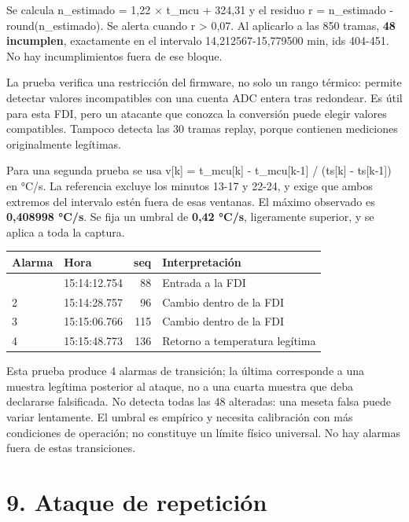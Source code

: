 \documentclass[
  11pt,
]{article}
\begin{document}
Se calcula n\_estimado = 1,22 × t\_mcu + 324,31 y el residuo r =
\textbar n\_estimado - round(n\_estimado)\textbar. Se alerta cuando r
\textgreater{} 0,07. Al aplicarlo a las 850 tramas, \textbf{48
incumplen}, exactamente en el intervalo 14,212567-15,779500 min, ids
404-451. No hay incumplimientos fuera de ese bloque.

La prueba verifica una restricción del firmware, no solo un rango
térmico: permite detectar valores incompatibles con una cuenta ADC
entera tras redondear. Es útil para esta FDI, pero un atacante que
conozca la conversión puede elegir valores compatibles. Tampoco detecta
las 30 tramas replay, porque contienen mediciones originalmente
legítimas.

Para una segunda prueba se usa v{[}k{]} = \textbar t\_mcu{[}k{]} -
t\_mcu{[}k-1{]}\textbar{} / (ts{[}k{]} - ts{[}k-1{]}) en °C/s. La
referencia excluye los minutos 13-17 y 22-24, y exige que ambos extremos
del intervalo estén fuera de esas ventanas. El máximo observado es
\textbf{0,408998 °C/s}. Se fija un umbral de \textbf{0,42 °C/s},
ligeramente superior, y se aplica a toda la captura.

\Needspace{4.5cm}
\begin{longtable}[]{@{}llrl@{}}
\toprule\noalign{}
Alarma & Hora & seq & Interpretación \\
\midrule\noalign{}
\endhead
\bottomrule\noalign{}
\endlastfoot
1 & 15:14:12.754 & 88 & Entrada a la FDI \\
2 & 15:14:28.757 & 96 & Cambio dentro de la FDI \\
3 & 15:15:06.766 & 115 & Cambio dentro de la FDI \\
4 & 15:15:48.773 & 136 & Retorno a temperatura legítima \\
\end{longtable}

Esta prueba produce 4 alarmas de transición; la última corresponde a una
muestra legítima posterior al ataque, no a una cuarta muestra que deba
declararse falsificada. No detecta todas las 48 alteradas: una meseta
falsa puede variar lentamente. El umbral es empírico y necesita
calibración con más condiciones de operación; no constituye un límite
físico universal. No hay alarmas fuera de estas transiciones.

\hypertarget{ataque-de-repeticiuxf3n}{%
\section{9. Ataque de repetición}\label{ataque-de-repeticiuxf3n}}
\end{document}
